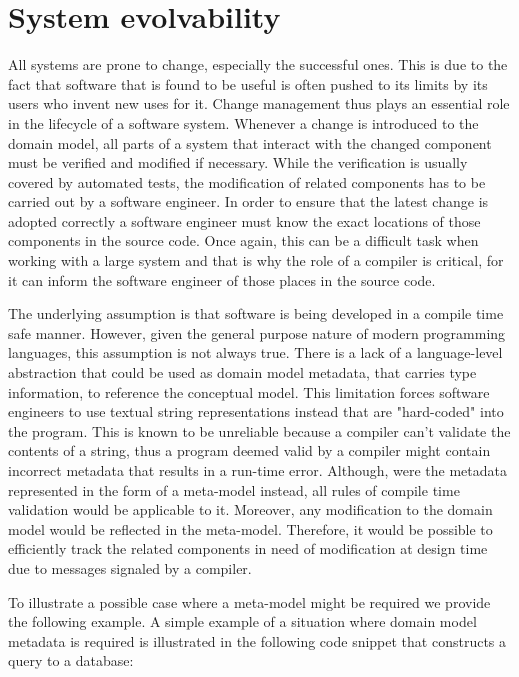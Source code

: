 \section{System evolvability}
All systems are prone to change, especially the successful ones.
This is due to the fact that software that is found to be useful is often pushed to its limits by its users who invent new uses for it.
Change management thus plays an essential role in the lifecycle of a software system.
Whenever a change is introduced to the domain model, all parts of a system that interact with the changed component must be verified and modified if necessary.
While the verification is usually covered by automated tests, the modification of related components has to be carried out by a software engineer.
In order to ensure that the latest change is adopted correctly a software engineer must know the exact locations of those components in the source code.
Once again, this can be a difficult task when working with a large system and that is why the role of a compiler is critical, for it can inform the software engineer of those places in the source code.

\n

The underlying assumption is that software is being developed in a compile time safe manner.
However, given the general purpose nature of modern programming languages, this assumption is not always true.
There is a lack of a language-level abstraction that could be used as domain model metadata, that carries type information, to reference the conceptual model.
This limitation forces software engineers to use textual string representations instead that are "hard-coded" into the program.
This is known to be unreliable because a compiler can't validate the contents of a string, thus a program deemed valid by a compiler might contain incorrect metadata that results in a run-time error.
Although, were the metadata represented in the form of a meta-model instead, all rules of compile time validation would be applicable to it.
Moreover, any modification to the domain model would be reflected in the meta-model.
Therefore, it would be possible to efficiently track the related components in need of modification at design time due to messages signaled by a compiler.

\n

To illustrate a possible case where a meta-model might be required we provide the following example.
A simple example of a situation where domain model metadata is required is illustrated in the following code snippet that constructs a query to a database:

